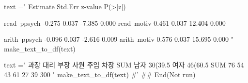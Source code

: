 \documentclass[a4paper]{book}
\begin{document}
\begin{Examples}
\begin{ExampleCode}
text ="                   Estimate  Std.Err  z-value  P(>|z|)

    read~ppsych           -0.275    0.037   -7.385    0.000
    read~motiv             0.461    0.037   12.404    0.000

    arith~ppsych           -0.096    0.037   -2.616    0.009
     arith~motiv             0.576    0.037   15.695    0.000
"
make_text_to_df(text)



text =" 과장 대리 부장 사원 주임 차장 SUM
남자 30(39.5%
여자 46(60.5%
SUM 76 54 43 61 27 39 300
"
make_text_to_df(text)
#' 
## End(Not run)

\end{ExampleCode}
\end{Examples}
\end{document}
